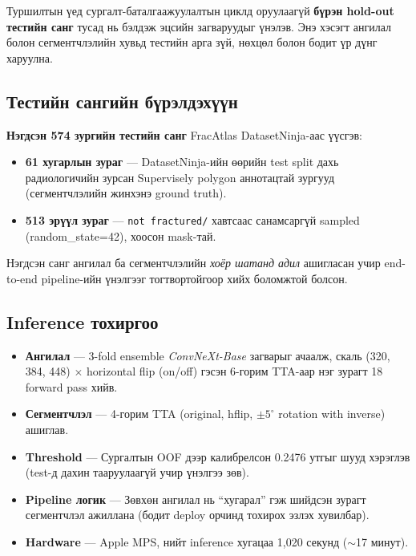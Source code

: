 Туршилтын үед сургалт-баталгаажуулалтын циклд оруулаагүй \textbf{бүрэн hold-out тестийн санг} тусад нь бэлдэж эцсийн загваруудыг үнэлэв. Энэ хэсэгт ангилал болон сегментчлэлийн хувьд тестийн арга зүй, нөхцөл болон бодит үр дүнг харуулна.

\subsection*{Тестийн сангийн бүрэлдэхүүн}

\textbf{Нэгдсэн 574 зургийн тестийн санг} FracAtlas DatasetNinja-аас үүсгэв:

\begin{itemize}
    \item \textbf{61 хугарлын зураг} — DatasetNinja-ийн өөрийн test split дахь радиологичийн зурсан Supervisely polygon аннотацтай зургууд (сегментчлэлийн жинхэнэ ground truth).
    \item \textbf{513 эрүүл зураг} — \texttt{not~fractured/} хавтсаас санамсаргүй sampled (random\_state=42), хоосон mask-тай.
\end{itemize}

Нэгдсэн санг ангилал ба сегментчлэлийн \emph{хоёр шатанд адил} ашигласан учир end-to-end pipeline-ийн үнэлгээг тогтвортойгоор хийх боломжтой болсон.

\subsection*{Inference тохиргоо}

\begin{itemize}
    \item \textbf{Ангилал} — 3-fold ensemble \emph{ConvNeXt-Base} загварыг ачаалж, скаль (320, 384, 448) $\times$ horizontal flip (on/off) гэсэн 6-горим TTA-аар нэг зурагт 18 forward pass хийв.
    \item \textbf{Сегментчлэл} — 4-горим TTA (original, hflip, $\pm5^\circ$ rotation with inverse) ашиглав.
    \item \textbf{Threshold} — Сургалтын OOF дээр калибрелсон 0.2476 утгыг шууд хэрэглэв (test-д дахин тааруулаагүй учир үнэлгээ зөв).
    \item \textbf{Pipeline логик} — Зөвхөн ангилал нь ``хугарал'' гэж шийдсэн зурагт сегментчлэл ажиллана (бодит deploy орчинд тохирох эзлэх хувилбар).
    \item \textbf{Hardware} — Apple MPS, нийт inference хугацаа 1{,}020 секунд ($\sim$17 минут).
\end{itemize}

